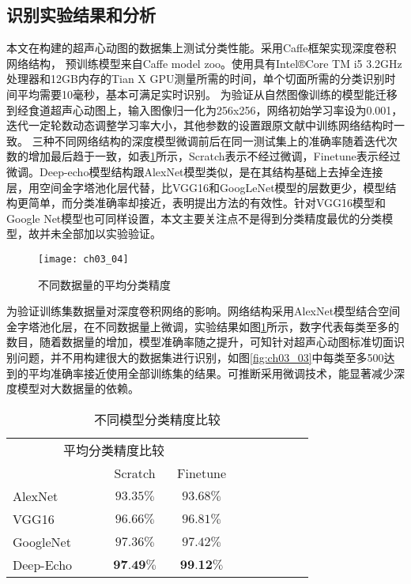 \subsection{识别实验结果和分析}

	本文在构建的超声心动图的数据集上测试分类性能。采用Caffe框架\citep{Jia2014}实现深度卷积网络结构， 预训练模型来自Caffe model zoo。使用具有Intel®Core TM i5 3.2GHz处理器和12GB内存的Tian X GPU测量所需的时间，单个切面所需的分类识别时间平均需要10毫秒，基本可满足实时识别。
为验证从自然图像训练的模型能迁移到经食道超声心动图上，输入图像归一化为256x256，网络初始学习率设为0.001，迭代一定轮数动态调整学习率大小，其他参数的设置跟原文献中训练网络结构时一致。 三种不同网络结构的深度模型微调前后在同一测试集上的准确率随着迭代次数的增加最后趋于一致，如表\ref{tab:ch03_01}所示，Scratch表示不经过微调，Finetune表示经过微调。Deep-echo模型结构跟AlexNet模型类似，是在其结构基础上去掉全连接层，用空间金字塔池化层代替，比VGG16和GoogLeNet模型的层数更少，模型结构更简单，而分类准确率却接近，表明提出方法的有效性。针对VGG16模型和Google Net模型也可同样设置，本文主要关注点不是得到分类精度最优的分类模型，故并未全部加以实验验证。
\begin{figure}[!htbp]
\centering
\texttt{[image: ch03\_04]}
\caption{不同数据量的平均分类精度}
\label{fig:ch03_04}
\end{figure} 
为验证训练集数据量对深度卷积网络的影响。网络结构采用AlexNet模型结合空间金字塔池化层，在不同数据量上微调，实验结果如图\ref{fig:ch03_04}所示，数字代表每类至多的数目，随着数据量的增加，模型准确率随之提升，可知针对超声心动图标准切面识别问题，并不用构建很大的数据集进行识别，如图\ref{fig:ch03_03}中每类至多500达到的平均准确率接近使用全部训练集的结果。可推断采用微调技术，能显著减少深度模型对大数据量的依赖。
\begin{table}[!htbp]
    \centering
    \footnotesize%
    \setlength{\tabcolsep}{4pt}%
    \renewcommand{\arraystretch}{1.2}%
    \begin{tabular}{lcccccccc}
        \hline\hline
          \multicolumn{2}{c}{\ \ \ \ \ \ \ \ 平均分类精度比较} \\
        \cline{2-3}%
           \qquad  & Scratch & Finetune \\
        \hline
        AlexNet & $93.35\%$ & $93.68\%$ \\
        \hline
        VGG16 & $96.66\%$ & $96.81\%$ \\
        \hline
        GoogleNet & $97.36\%$ & $97.42\%$ \\
        \hline
        Deep-Echo & $\textbf{97.49\%}$ & $\textbf{99.12\%}$ \\
        \hline\hline
    \end{tabular}
    \caption{不同模型分类精度比较}
    \label{tab:ch03_01}
\end{table}


